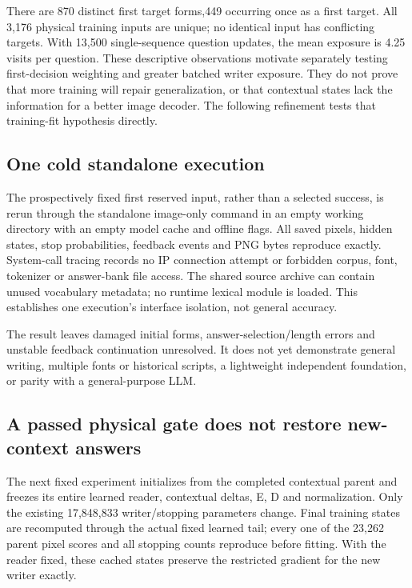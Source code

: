 \documentclass[10pt,a4paper]{article}
\providecommand{\DIFadd}[1]{{\protect\color{blue} \sf #1}} %
\begin{document}
\DIFadd{There are 870 distinct first target forms,449 occurring once as a first target.
All 3,176 physical training inputs are unique; no identical input has conflicting
targets. With 13,500 single-sequence question updates, the mean exposure is
4.25 visits per question. These descriptive observations motivate separately
testing first-decision weighting and greater batched writer exposure. They
do not prove that more training will repair generalization, or that contextual
states lack the information for a better image decoder. The following refinement tests that training-fit hypothesis directly.
}

\subsection*{\DIFadd{One cold standalone execution}}
\DIFadd{The prospectively fixed first reserved input, rather than a selected success,
is rerun through the standalone image-only command in an empty working
directory with an empty model cache and offline flags. All saved pixels,
hidden states, stop probabilities, feedback events and PNG bytes reproduce
exactly. System-call tracing records no IP connection attempt or forbidden
corpus, font, tokenizer or answer-bank file access. The shared source archive
can contain unused vocabulary metadata; no runtime lexical module is loaded.
This establishes one execution's interface isolation, not general accuracy.
}

\DIFadd{The result leaves damaged initial forms, answer-selection/length errors and
unstable feedback continuation unresolved. It does not yet demonstrate
general writing, multiple fonts or historical scripts, a lightweight
independent foundation, or parity with a general-purpose LLM.
}

\subsection*{\DIFadd{A passed physical gate does not restore new-context answers}}
\DIFadd{The next fixed experiment initializes from the completed contextual parent
and freezes its entire learned reader, contextual deltas, E, D and normalization.
Only the existing 17,848,833 writer/stopping parameters change. Final training
states are recomputed through the actual fixed learned tail; every one of the
23,262 parent pixel scores and all stopping counts reproduce before fitting.
With the reader fixed, these cached states preserve the restricted gradient
for the new writer exactly.
}
\end{document}
